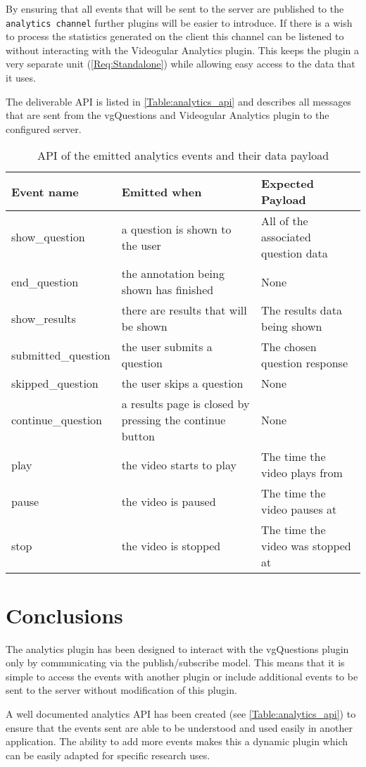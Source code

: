 By ensuring that all events that will be sent to the server are published to the \lstinline|analytics channel| further plugins will be easier to introduce. If there is a wish to process the statistics generated on the client this channel can be listened to without interacting with the \gls{Videogular} Analytics plugin. This keeps the plugin a very separate unit (\cref{Req:Standalone}) while allowing easy access to the data that it uses.

The deliverable \gls{API} is listed in \autoref{Table:analytics_api} and describes all messages that are sent from the \gls{vgQuestions} and  \gls{Videogular} Analytics plugin to the configured server.

\begin{table}[h]
\caption{\label{Table:analytics_api}API of the emitted analytics events and their data payload}
\begin{tabular}{p{3.2cm} p{6cm} p{4cm}}
\textbf{Event name} & \textbf{Emitted when} & \textbf{Expected Payload} \\
\hline
show\_question & a question is shown to the user & All of the associated question data \\
\hline
end\_question & the annotation being shown has finished & None \\
\hline
show\_results & there are results that will be shown & The results data being shown \\
\hline
submitted\_question & the user submits a question & The chosen question response \\
\hline
skipped\_question & the user skips a question & None \\
\hline
continue\_question & a results page is closed by pressing the continue button & None \\
\hline
play & the video starts to play & The time the video plays from \\
\hline
pause & the video is paused & The time the video pauses at \\
\hline
stop & the video is stopped & The time the video was stopped at \\
\end{tabular}
\end{table}

\section{Conclusions}

The analytics plugin has been designed to interact with the \gls{vgQuestions} plugin only by communicating via the publish/subscribe model. This means that it is simple to access the events with another plugin or include additional events to be sent to the server without modification of this plugin.

A well documented analytics \gls{API} has been created (see \autoref{Table:analytics_api}) to ensure that the events sent are able to be understood and used easily in another application. The ability to add more events makes this a dynamic plugin which can be easily adapted for specific research uses.